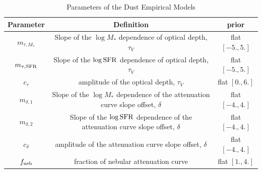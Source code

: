\begin{table}
    \caption{Parameters of the Dust Empirical Models}
    \begin{center}
        \begin{tabular}{ccc} \toprule
            Parameter & Definition & prior\\[3pt] \hline\hline
            $m_{\tau,M_*}$ & Slope of the $\log M_*$ dependence of optical depth,
            $\tau_V$ & flat $[-5., 5.]$\\
            $m_{\tau,{\rm SFR}}$ & Slope of the $\log {\rm SFR}$ dependence of optical depth, $\tau_V$ & flat $[-5., 5.]$\\
            $c_{\tau}$ & amplitude of the optical depth, $\tau_V$ & flat $[0., 6.]$\\
            $m_{\delta,1}$ & Slope of the $\log M_*$ dependence of the
            attenuation curve slope offset, $\delta$ & flat $[-4., 4.]$\\
            $m_{\delta,2}$ & Slope of the $\log {\rm SFR}$ dependence of the
            attenuation curve slope offset, $\delta$ & flat $[-4., 4.]$\\
            $c_{\delta}$ & amplitude of the attenuation curve slope offset, $\delta$ & flat $[-4., 4.]$\\
            $f_{\rm neb}$ & fraction of nebular attenuation curve & flat $[1., 4.]$\\
            \hline
        \end{tabular} \label{tab:free_param}
    \end{center}
\end{table}

